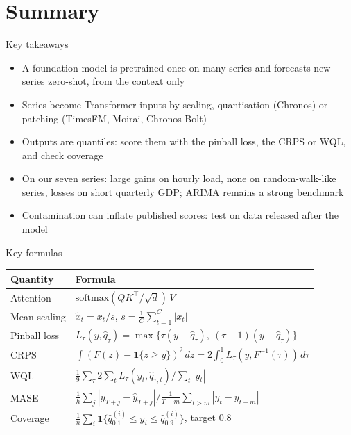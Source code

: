 \section{Summary}

\begin{frame}{Key takeaways}
\itemsize{\small}
\begin{itemize}
    \item A foundation model is pretrained once on many series and forecasts new series zero-shot, from the context only
    \item Series become Transformer inputs by scaling, quantisation (Chronos) or patching (TimesFM, Moirai, Chronos-Bolt)
    \item Outputs are quantiles: score them with the pinball loss, the CRPS or WQL, and check coverage
    \item On our seven series: large gains on hourly load, none on random-walk-like series, losses on short quarterly GDP; ARIMA remains a strong benchmark
    \item Contamination can inflate published scores: test on data released after the model
\end{itemize}
\end{frame}

\begin{frame}{Key formulas}
\itemsize{\small}
{\renewcommand{\arraystretch}{1.4}\begin{center}
\footnotesize
\begin{tabular}{ll}
\toprule
\textbf{Quantity} & \textbf{Formula} \\
\midrule
Attention & $\text{softmax}(QK^\top/\sqrt{d})\,V$ \\
Mean scaling & $\tilde x_t = x_t/s$, \quad $s = \frac1C\sum_{t=1}^{C}|x_t|$ \\
Pinball loss & $L_\tau(y, \hat q_\tau) = \max\{\tau(y - \hat q_\tau),\ (\tau - 1)(y - \hat q_\tau)\}$ \\
CRPS & $\int (F(z) - \mathbf{1}\{z \ge y\})^2\,dz = 2\int_0^1 L_\tau(y, F^{-1}(\tau))\,d\tau$ \\
WQL & $\frac{1}{9}\sum_{\tau} 2\sum_t L_{\tau}(y_t, \hat q_{\tau,t}) \big/ \sum_t |y_t|$ \\
MASE & $\frac1h\sum_j |y_{T+j} - \hat y_{T+j}| \Big/ \frac{1}{T-m}\sum_{t>m}|y_t - y_{t-m}|$ \\
Coverage & $\frac1n\sum_i \mathbf{1}\{\hat q_{0.1}^{(i)} \le y_i \le \hat q_{0.9}^{(i)}\}$, target 0.8 \\
\bottomrule
\end{tabular}
\end{center}
}
\end{frame}

